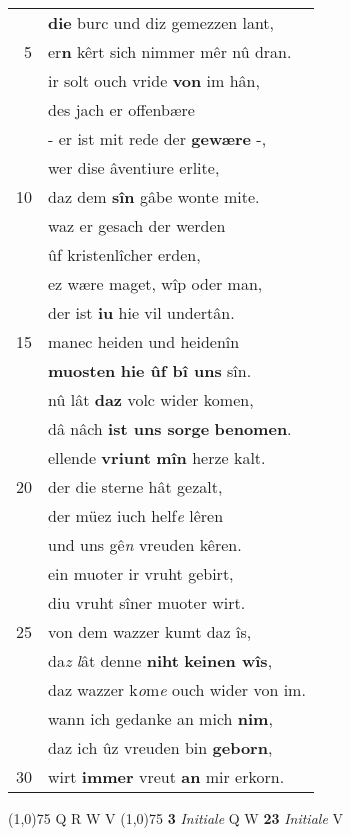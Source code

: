 \documentclass[8pt,a4paper,notitlepage]{article}
\begin{document}
\begin{table}[ht]
\begin{minipage}[t]{0.5\linewidth}
\begin{tabular}{rl}
 & \textbf{die} burc und diz gemezzen lant,\\ 
5 & er\textbf{n} kêrt sich nimmer mêr nû dran.\\ 
 & ir solt ouch vride \textbf{von} im hân,\\ 
 & des jach er offenbære\\ 
 & - er ist mit rede der \textbf{gewære} -,\\ 
 & wer dise âventiure erlite,\\ 
10 & daz dem \textbf{sîn} gâbe wonte mite.\\ 
 & waz er gesach der werden\\ 
 & ûf kristenlîcher erden,\\ 
 & ez wære maget, wîp oder man,\\ 
 & der ist \textbf{iu} hie vil undertân.\\ 
15 & manec heiden und heidenîn\\ 
 & \textbf{muosten} \textbf{hie ûf bî uns} sîn.\\ 
 & nû lât \textbf{daz} volc wider komen,\\ 
 & dâ nâch \textbf{ist uns sorge} \textbf{benomen}.\\ 
 & ellende \textbf{vriunt} \textbf{mîn} herze kalt.\\ 
20 & der die sterne hât gezalt,\\ 
 & der müez iuch helf\textit{e} lêren\\ 
 & und uns gê\textit{n} vreuden kêren.\\ 
 & ein muoter ir vruht gebirt,\\ 
 & diu vruht sîner muoter wirt.\\ 
25 & von dem wazzer kumt daz îs,\\ 
 & da\textit{z} \textit{l}ât denne \textbf{niht} \textbf{keinen wîs},\\ 
 & daz wazzer k\textit{o}m\textit{e} ouch wider von im.\\ 
 & wann ich gedanke an mich \textbf{nim},\\ 
 & daz ich ûz vreuden bin \textbf{geborn},\\ 
30 & wirt \textbf{immer} vreut \textbf{an} mir erkorn.\\ 
\end{tabular}
\scriptsize
\line(1,0){75} \newline
Q R W V \newline
\line(1,0){75} \newline
\textbf{3} \textit{Initiale} Q W  \textbf{23} \textit{Initiale} V  \newline

\end{minipage}
\end{table}
\end{document}
